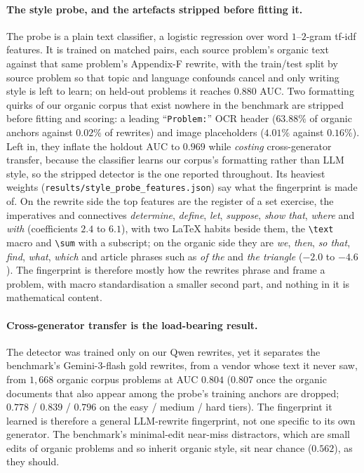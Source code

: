 \paragraph{The style probe, and the artefacts stripped before fitting it.}The probe is a plain text classifier, a logistic regression over word $1$--$2$-gram tf-idf features. It is trained on matched pairs, each source problem's organic text against that same problem's Appendix-F rewrite, with the train/test split by source problem so that topic and language confounds cancel and only writing style is left to learn; on held-out problems it reaches $0.880$ AUC. Two formatting quirks of our organic corpus that exist nowhere in the benchmark are stripped before fitting and scoring: a leading ``\texttt{Problem:}'' OCR header ($63.88\%$ of organic anchors against $0.02\%$ of rewrites) and image placeholders ($4.01\%$ against $0.16\%$). Left in, they inflate the holdout AUC to $0.969$ while \emph{costing} cross-generator transfer, because the classifier learns our corpus's formatting rather than LLM style, so the stripped detector is the one reported throughout. Its heaviest weights (\texttt{results/style\_probe\_features.json}) say what the fingerprint is made of. On the rewrite side the top features are the register of a set exercise, the imperatives and connectives \emph{determine}, \emph{define}, \emph{let}, \emph{suppose}, \emph{show that}, \emph{where} and \emph{with} (coefficients $2.4$ to $6.1$), with two LaTeX habits beside them, the \texttt{\textbackslash text} macro and \texttt{\textbackslash sum} with a subscript; on the organic side they are \emph{we}, \emph{then}, \emph{so that}, \emph{find}, \emph{what}, \emph{which} and article phrases such as \emph{of the} and \emph{the triangle} ($-2.0$ to $-4.6$). The fingerprint is therefore mostly how the rewrites phrase and frame a problem, with macro standardisation a smaller second part, and nothing in it is mathematical content.

\paragraph{Cross-generator transfer is the load-bearing result.}The detector was trained only on our Qwen rewrites, yet it separates the benchmark's Gemini-3-flash gold rewrites, from a vendor whose text it never saw, from $1{,}668$ organic corpus problems at AUC $0.804$ ($0.807$ once the organic documents that also appear among the probe's training anchors are dropped; $0.778$ / $0.839$ / $0.796$ on the easy / medium / hard tiers). The fingerprint it learned is therefore a general LLM-rewrite fingerprint, not one specific to its own generator. The benchmark's minimal-edit near-miss distractors, which are small edits of organic problems and so inherit organic style, sit near chance ($0.562$), as they should.

